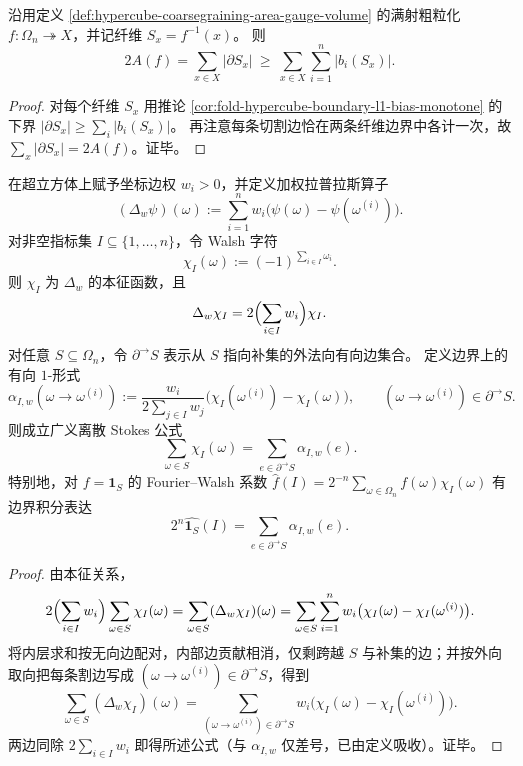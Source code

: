 \begin{corollary}[粗粒化切割面积的偏差下界]\label{cor:fold-hypercube-cutedges-bias-l1}
沿用定义 \ref{def:hypercube-coarsegraining-area-gauge-volume} 的满射粗粒化 \(f:\Omega_n\twoheadrightarrow X\)，并记纤维 \(S_x=f^{-1}(x)\)。
则
\[
2A(f)=\sum_{x\in X}|\partial S_x|
\ \ge\
\sum_{x\in X}\sum_{i=1}^n |b_i(S_x)|.
\]
\end{corollary}
\begin{proof}
对每个纤维 \(S_x\) 用推论 \ref{cor:fold-hypercube-boundary-l1-bias-monotone} 的下界 \(|\partial S_x|\ge \sum_i |b_i(S_x)|\)。
再注意每条切割边恰在两条纤维边界中各计一次，故 \(\sum_x|\partial S_x|=2A(f)\)。证毕。
\end{proof}

\begin{theorem}\label{thm:fold-hypercube-weighted-walsh-stokes}
在超立方体上赋予坐标边权 \(w_i>0\)，并定义加权拉普拉斯算子
\[
(\Delta_w\psi)(\omega):=\sum_{i=1}^n w_i\bigl(\psi(\omega)-\psi(\omega^{(i)})\bigr).
\]
对非空指标集 \(I\subseteq\{1,\dots,n\}\)，令 Walsh 字符
\[
\chi_I(\omega):=(-1)^{\sum_{i\in I}\omega_i}.
\]
则 \(\chi_I\) 为 \(\Delta_w\) 的本征函数，且
\[
\Delta_w\chi_I=2\Bigl(\sum_{i\in I}w_i\Bigr)\chi_I.
\]
对任意 \(S\subseteq\Omega_n\)，令 \(\partial^{\to}S\) 表示从 \(S\) 指向补集的外法向有向边集合。
定义边界上的有向 \(1\)-形式
\[
\alpha_{I,w}(\omega\to\omega^{(i)})
:=\frac{w_i}{2\sum_{j\in I}w_j}\bigl(\chi_I(\omega^{(i)})-\chi_I(\omega)\bigr),
\qquad (\omega\to\omega^{(i)})\in\partial^{\to}S.
\]
则成立广义离散 Stokes 公式
\[
\boxed{\;\sum_{\omega\in S}\chi_I(\omega)=\sum_{e\in \partial^{\to}S}\alpha_{I,w}(e).\;}
\]
特别地，对 \(f=\mathbf 1_S\) 的 Fourier--Walsh 系数
\(
\widehat f(I)=2^{-n}\sum_{\omega\in\Omega_n}f(\omega)\chi_I(\omega)
\)
有边界积分表达
\[
2^n\widehat{\mathbf 1_S}(I)=\sum_{e\in \partial^{\to}S}\alpha_{I,w}(e).
\]
\end{theorem}
\begin{proof}
由本征关系，
\[
2\Bigl(\sum_{i\in I}w_i\Bigr)\sum_{\omega\in S}\chi_I(\omega)
=\sum_{\omega\in S}(\Delta_w\chi_I)(\omega)
=\sum_{\omega\in S}\sum_{i=1}^n w_i\bigl(\chi_I(\omega)-\chi_I(\omega^{(i)})\bigr).
\]
将内层求和按无向边配对，内部边贡献相消，仅剩跨越 \(S\) 与补集的边；并按外向取向把每条割边写成 \((\omega\to\omega^{(i)})\in\partial^{\to}S\)，得到
\[
\sum_{\omega\in S}(\Delta_w\chi_I)(\omega)
=\sum_{(\omega\to\omega^{(i)})\in\partial^{\to}S}w_i\bigl(\chi_I(\omega)-\chi_I(\omega^{(i)})\bigr).
\]
两边同除 \(2\sum_{i\in I}w_i\) 即得所述公式（与 \(\alpha_{I,w}\) 仅差号，已由定义吸收）。证毕。
\end{proof}

